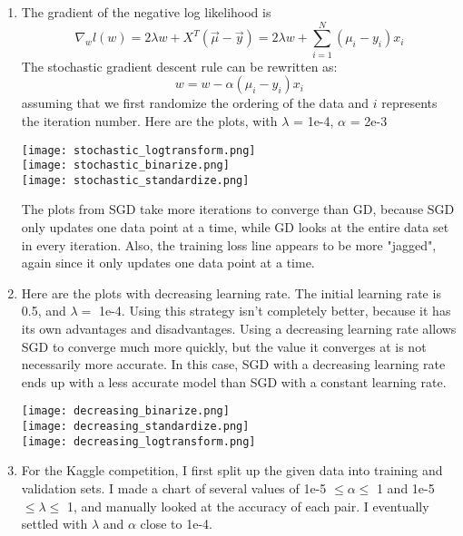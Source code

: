 \documentclass[11pt]{article}
\begin{document}
\begin{enumerate}
\item The gradient of the negative log likelihood is 
$$\nabla_w l(w)= 2 \lambda w + X^T (\vec \mu - \vec y) = 2 \lambda w  + \sum_{i=1}^{N}(\mu_i - y_i)x_i$$
The stochastic gradient descent rule can be rewritten as:
$$w = w - \alpha(\mu_i - y_i) x_i$$
assuming that we first randomize the ordering of the data and $i$ represents the iteration number. Here are the plots, with  $\lambda$ = 1e-4, $\alpha$ = 2e-3\\
\begin{center}
\texttt{[image: stochastic\_logtransform.png]}\\
\texttt{[image: stochastic\_binarize.png]}\\
\texttt{[image: stochastic\_standardize.png]}
\end{center}
The plots from SGD take more iterations to converge than GD, because SGD only updates one data point at a time, while GD looks at the entire data set in every iteration. Also, the training loss line appears to be more "jagged", again since it only updates one data point at a time. 
\item Here are the plots with decreasing learning rate. The initial learning rate is 0.5, and $\lambda = $ 1e-4. Using this strategy isn't completely better, because it has its own advantages and disadvantages. Using a decreasing learning rate allows SGD to converge much more quickly, but the value it converges at is not necessarily more accurate. In this case, SGD with a decreasing learning rate ends up with a less accurate model than SGD with a constant learning rate.
\begin{center}
\texttt{[image: decreasing\_binarize.png]}\\
\texttt{[image: decreasing\_standardize.png]}\\
\texttt{[image: decreasing\_logtransform.png]}
\end{center}
\item For the Kaggle competition, I first split up the given data into training and validation sets. I made a chart of several values of 1e-5 $\leq \alpha \leq $ 1 and 1e-5 $\leq \lambda \leq $ 1, and manually looked at the accuracy of each pair. I eventually settled with $\lambda$ and $\alpha$ close to 1e-4.

\end{enumerate}
\end{document}
